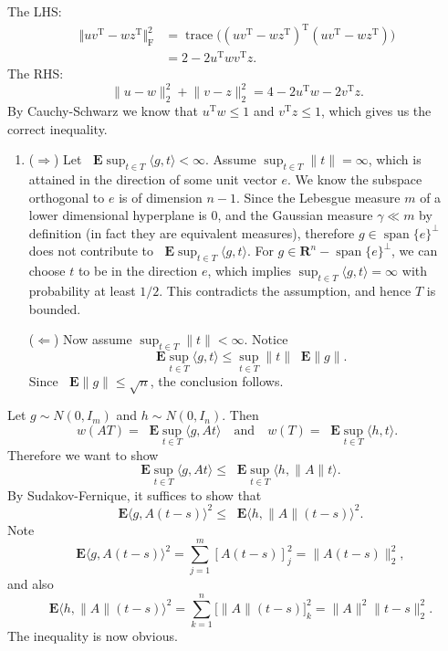 \documentclass[11pt]{article}
\newcommand{\R}{\mathbf{R}}
\newcommand{\inp}[2]{\langle #1, #2 \rangle}
\newcommand{\nm}[1]{\lVert #1 \rVert}
\newcommand{\trp}{\mathrm T}
\newcommand{\trace}{\operatorname{trace}}
\renewcommand{\implies}{\Rightarrow}
\renewcommand{\impliedby}{\Leftarrow}
\newcommand{\E}{\mathop{}\!\mathbf{E}}
\theoremstyle{plain}
\theoremstyle{definition}
\theoremstyle{remark}
\theoremstyle{definition}
\newenvironment{mansol}[1]{%
  \renewcommand\themansolinner{#1}%
  \mansolinner
}{\endmansolinner}
\begin{document}
\begin{mansol}{7.3.2}The LHS: \begin{align*}
    \bigl\Vert uv^\trp - w z^\trp\bigr\Vert ^2_\mathrm{F} & = \trace \bigl((uv^\trp -wz^\trp)^\trp (uv^\trp -wz^\trp)\bigr)\\
    & = 2 - 2 u^\trp w v^\trp z.
\end{align*}
The RHS: \[
    \nm{u-w}_2^2 + \nm{v-z}_2^2 = 4 - 2u^\trp w - 2v^\trp z.
\]
By Cauchy-Schwarz we know that $u^\trp w\leq 1$ and $v^\trp z \leq 1$, which gives us the correct inequality.
\end{mansol}
\begin{mansol}{7.5.3}
    \begin{enumerate}
        \item ($\implies$) Let $\E \sup_{t\in T} \inp{g}{t} <\infty$. Assume $\sup_{t \in T} \nm{t} =\infty$, which is attained in the direction of some unit vector $e$. We know the subspace orthogonal to $e$ is of dimension $n - 1$. Since the Lebesgue measure $m$ of a lower dimensional hyperplane is $0$, and the Gaussian measure $\gamma \ll m$ by definition (in fact they are equivalent measures), therefore $g \in \operatorname{span}\{e\}^\perp$ does not contribute to $\E \sup_{t \in T} \inp{g}{t}$. For $g \in \R^n - \operatorname{span}\{e\}^\perp$, we can choose $t$ to be in the direction $e$, which implies $\sup_{t\in T}\inp{g}{t} = \infty$ with probability at least $1/2$. This contradicts the assumption, and hence $T$ is bounded.
    
    ($\impliedby$) Now assume $\sup_{t \in T}\nm{t} <\infty$. Notice \[
        \E \sup_{t\in T}\inp{g}{t} \leq \sup_{t\in T}\nm{t} \E \nm{g}.
    \] Since $\E \nm{g} \leq \sqrt{n}$, the conclusion follows.
    \end{enumerate}
\end{mansol}
\begin{mansol}{7.5.4}
    Let $g \sim N(0,I_m)$ and $h \sim N(0,I_n)$. Then \[
        w(AT) = \E \sup_{t\in T} \inp{g}{At} \quad \text{and} \quad 
        w(T) = \E \sup_{t\in T} \inp{h}{t}.
    \] Therefore we want to show \[
        \E \sup_{t\in T} \inp{g}{At} \leq \E \sup_{t\in T} \inp{h}{\nm{A}t}.
    \] By Sudakov-Fernique, it suffices to show that \[
        \E \inp{g}{A(t-s)}^2 \leq \E \inp{h}{\nm{A}(t-s)}^2.
    \] Note \[
        \E \inp{g}{A(t-s)}^2 = \sum_{j=1}^m [A(t-s)]_j^2 = \nm{A(t-s)}_2^2,
    \] and also \[
        \E \inp{h}{\nm{A}(t-s)}^2 = \sum_{k=1}^n \bigl[\nm{A}(t-s)\bigr]_k^2 = \nm{A}^2\nm{t-s}_2^2.
    \] The inequality is now obvious.
\end{mansol}
\end{document}
